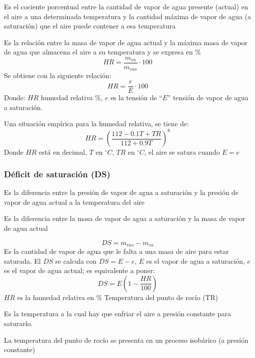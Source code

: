 Es el cociente porcentual entre la cantidad de vapor de agua presente (actual) en el aire a una determinada temperatura y la cantidad máxima de vapor de agua (a saturación) que el aire puede contener a esa temperatura

Es la relación entre la masa de vapor de agua actual y la máxima masa de vapor de agua que almacena el aire a su temperatura y se expresa en \%
\begin{equation}
    HR = \frac{m_{va}}{m_{vas}}\cdot 100
\end{equation}
Se obtiene con la siguiente relación:
\begin{equation}
    HR= \frac{e}{E}\cdot 100
\end{equation}
Donde: $HR$ humedad relativa \%, $e$ es la tensión de ``$E$'' tensión de vapor de agua a saturación.

Una situación empírica para la humedad relativa, se tiene de:
\begin{equation}
    HR = \left(\frac{112 - 0.1T + TR}{112 + 0.9T}\right)^8
\end{equation}
Donde $HR$ está en decimal, $T$ en $^{\circ}C$, $TR$ en $^{\circ}C$, el aire se satura cuando $E=e$
\subsubsection{Déficit de saturación (DS)}

Es la diferencia entre la presión de vapor de agua a saturación y la presión de vapor de agua actual a la temperatura del aire

Es la diferencia entre la masa de vapor de agua a saturación y la masa de vapor de agua actual

\begin{equation}
    DS = m_{vas} -m_{va}
\end{equation}
Es la cantidad de vapor de agua que le falta a una masa de aire para estar saturada. El $DS$ se calcula con $DS=E-e$, $E$ es el vapor de agua a saturación, $e$ es el vapor de agua actual; es equivalente a poner:
\begin{equation}
    DS = E\left(1 - \frac{HR}{100} \right)
\end{equation}
$HR$ es la humedad relativa en \%
Temperatura del punto de rocío (TR)

Es la temperatura a la cual hay que enfriar el aire a presión constante para saturarlo.

La temperatura del punto de rocío se presenta en un proceso isobárico (a presión constante)

